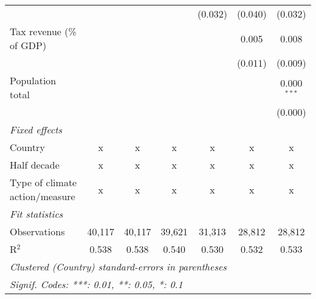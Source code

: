 \begin{tabular}{lcccccc}
                                                      &         &               &               & (0.032)       & (0.040)       & (0.032)\\   
   Tax revenue (\% of GDP)                            &         &               &               &               & 0.005         & 0.008\\   
                                                      &         &               &               &               & (0.011)       & (0.009)\\   
   Population total                                   &         &               &               &               &               & 0.000$^{***}$\\   
                                                      &         &               &               &               &               & (0.000)\\   
   \emph{Fixed effects}\\
   Country                                            & x       & x             & x             & x             & x             & x\\  
   Half decade                                        & x       & x             & x             & x             & x             & x\\  
   Type of climate action/measure                     & x       & x             & x             & x             & x             & x\\  
   \midrule \emph{Fit statistics}\\
   Observations                                       & 40,117  & 40,117        & 39,621        & 31,313        & 28,812        & 28,812\\  
   R$^2$                                              & 0.538   & 0.538         & 0.540         & 0.530         & 0.532         & 0.533\\  
   \midrule
   \multicolumn{7}{l}{\emph{Clustered (Country) standard-errors in parentheses}}\\
   \multicolumn{7}{l}{\emph{Signif. Codes: ***: 0.01, **: 0.05, *: 0.1}}\\
\end{tabular}
\par\endgroup


